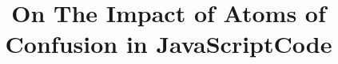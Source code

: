 \documentclass[preprint,12pt]{elsarticle}
\begin{document}
\begin{frontmatter}


\title{On The Impact of Atoms of Confusion in JavaScriptCode}



\end{frontmatter}




%






{\small
 

}
\end{document}
